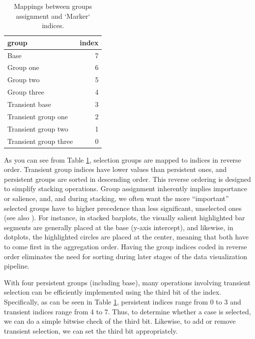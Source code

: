 \documentclass[
  openany]{book}
\theoremstyle{definition}
\theoremstyle{definition}
\theoremstyle{definition}
\theoremstyle{definition}
\theoremstyle{remark}
\begin{document}
\begin{table}

\caption{\label{tab:index-table}Mappings between groups assignment and `Marker` indices.}
\centering
\begin{tabular}[t]{lr}
\toprule
group & index\\
\midrule
Base & 7\\
Group one & 6\\
Group two & 5\\
Group three & 4\\
Transient base & 3\\
\addlinespace
Transient group one & 2\\
Transient group two & 1\\
Transient group three & 0\\
\bottomrule
\end{tabular}
\end{table}

As you can see from Table \ref{tab:index-table}, selection groups are mapped to indices in reverse order. Transient group indices have lower values than persistent ones, and persistent groups are sorted in descending order. This reverse ordering is designed to simplify stacking operations. Group assignment inherently implies importance or salience, and, and during stacking, we often want the more ``important'' selected groups have to higher precedence than less significant, unselected ones (see also ). For instance, in stacked barplots, the visually salient highlighted bar segments are generally placed at the base (y-axis intercept), and likewise, in dotplots, the highlighted circles are placed at the center, meaning that both have to come first in the aggregation order. Having the group indices coded in reverse order eliminates the need for sorting during later stages of the data visualization pipeline.

With four persistent groups (including base), many operations involving transient selection can be efficiently implemented using the third bit of the index. Specifically, as can be seen in Table \ref{tab:index-table}, persistent indices range from 0 to 3 and transient indices range from 4 to 7. Thus, to determine whether a case is selected, we can do a simple bitwise check of the third bit. Likewise, to add or remove transient selection, we can set the third bit appropriately.
\end{document}
